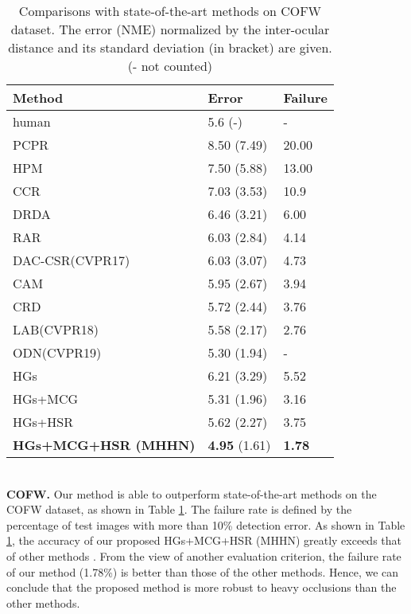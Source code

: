 \documentclass[journal]{IEEEtran}
\begin{document}
\begin{table}
	\caption{Comparisons with state-of-the-art methods on COFW dataset. The error (NME) normalized by the inter-ocular distance and its standard deviation (in bracket) are given. (- not counted)}
	\begin{center}
		\begin{tabular}{p{3.8cm}p{1.6cm}p{1.6cm}}
			\hline
			Method & Error  & Failure \\
			\hline
			human&	5.6 (-)&	-\\
			PCPR\cite{Burgosartizzu2013Robust}&	8.50 (7.49)&	20.00\\
			HPM\cite{Ghiasi2014Occlusion}&	7.50 (5.88)&	13.00\\
			CCR\cite{Feng2015Cascaded}&	7.03 (3.53)&	10.9\\
			DRDA\cite{Zhang2016OcclusionFreeFA}&	6.46 (3.21)&	6.00\\
			RAR\cite{Xiao2016Robust}&	6.03 (2.84)&	4.14\\
			DAC-CSR(CVPR17)\cite{Feng2017DynamicAC}&	6.03 (3.07)&	4.73\\
			CAM\cite{Wan2019FaceAB}&	5.95 (2.67)&	3.94\\
			CRD\cite{wan2020robust}&5.72 (2.44) &3.76\\
			LAB(CVPR18)\cite{Wu2018LookAB}&	5.58  (2.17) &	2.76\\
			ODN(CVPR19)\cite{Zhu2019RobustFL}&	5.30  (1.94)&	-\\
			\hline
			HGs&	6.21 (3.29)  &	5.52\\
			HGs+MCG&	5.31 (1.96)  &	3.16\\
			HGs+HSR&	5.62 (2.27)  &	3.75\\	
			\textbf{HGs+MCG+HSR (MHHN)} &	\textbf{4.95} (1.61)&	\textbf{1.78} \\
			\hline
		\end{tabular}
	\end{center}
	\label{tabcofw}
\end{table}
\\\indent\textbf{COFW.} Our method is able to outperform state-of-the-art methods on the COFW dataset, as shown in Table \ref{tabcofw}. The failure rate is defined by the percentage of test images with more than 10\% detection error. As shown in Table \ref{tabcofw}, the accuracy of our proposed HGs+MCG+HSR (MHHN) greatly exceeds that of other methods \cite{Burgosartizzu2013Robust, Feng2015Cascaded, Zhang2016OcclusionFreeFA, Feng2017DynamicAC, Wu2018LookAB, Zhu2019RobustFL}. From the view of another evaluation criterion, the failure rate of our method (1.78\%) is better than those of the other methods. Hence, we can conclude that the proposed method is more robust to heavy occlusions than the other methods.
\end{document}
